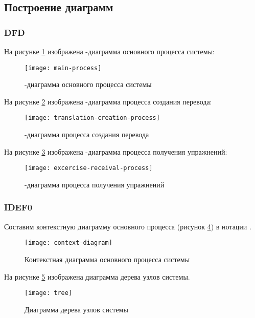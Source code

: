 \documentclass[a4paper,14pt]{extarticle}
\begin{document}
\subsection{Построение диаграмм}
\subsubsection{DFD}
На рисунке \ref{fig:main-process} изображена -диаграмма основного
процесса системы:

\begin{figure}[H]
    \centering
    \texttt{[image: main-process]}
    \caption{-диаграмма основного процесса системы}
    \label{fig:main-process}
\end{figure}

На рисунке \ref{fig:translation-creation-process} изображена
-диаграмма процесса создания перевода:

\begin{figure}[H]
    \centering
    \texttt{[image: translation-creation-process]}
    \caption{-диаграмма процесса создания перевода}
    \label{fig:translation-creation-process}
\end{figure}

На рисунке \ref{fig:excercise-receival-process} изображена -диаграмма
процесса получения упражнений:

\begin{figure}[H]
    \centering
    \texttt{[image: excercise-receival-process]}
    \caption{-диаграмма процесса получения упражнений}
    \label{fig:excercise-receival-process}
\end{figure}

\subsubsection{IDEF0}
Составим контекстную диаграмму основного процесса (рисунок \ref{fig:context-diagram}) в
нотации .

\begin{figure}[H]
    \centering
    \texttt{[image: context-diagram]}
    \caption{Контекстная диаграмма основного процесса системы}
    \label{fig:context-diagram}
\end{figure}

На рисунке \ref{fig:tree} изображена диаграмма дерева узлов системы.
\begin{figure}[H]
    \centering
    \texttt{[image: tree]}
    \caption{Диаграмма дерева узлов системы}
    \label{fig:tree}
\end{figure}
\end{document}
